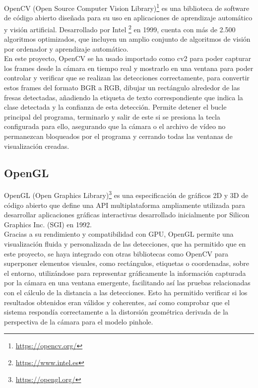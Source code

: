 OpenCV (Open Source Computer Vision Library)\footnote{\url{https://opencv.org/}} es una biblioteca de software de código abierto diseñada para su uso en aplicaciones de aprendizaje automático y visión artificial. Desarrollado por Intel \footnote{\url{https://www.intel.es}} en 1999, cuenta con más de 2.500 algoritmos optimizados, que incluyen un amplio conjunto de algoritmos de visión por ordenador y aprendizaje automático.\\ %

En este proyecto, OpenCV se ha usado importado como cv2 para poder capturar los frames desde la cámara en tiempo real y mostrarlo en una ventana para poder controlar y verificar que se realizan las detecciones correctamente, para convertir estos frames del formato BGR a RGB, dibujar un rectángulo alrededor de las fresas detectadas, añadiendo la etiqueta de texto correspondiente que indica la clase detectada y la confianza de esta detección. Permite detener el bucle principal del programa, terminarlo y salir de este si se presiona la tecla configurada para ello, asegurando que la cámara o el archivo de vídeo no permanezcan bloqueados por el programa y cerrando todas las ventanas de visualización creadas.

\subsection{OpenGL}
\label{sec:OpenCV}

OpenGL (Open Graphics Library)\footnote{\url{https://opengl.org/}} es una especificación de gráficos 2D y 3D de código abierto que define una API multiplataforma ampliamente utilizada para desarrollar aplicaciones gráficas interactivas desarrollado inicialmente por Silicon Graphics Inc. (SGI) en 1992.\\

Gracias a su rendimiento y compatibilidad con GPU, OpenGL permite una visualización fluida y personalizada de las detecciones, que ha permitido que en este proyecto, se haya integrado con otras bibliotecas como OpenCV para superponer elementos visuales, como rectángulos, etiquetas o coordenadas, sobre el entorno, utilizándose para representar gráficamente la información capturada por la cámara en una ventana emergente, facilitando así las pruebas relacionadas con el cálculo de la distancia a las detecciones. Esto ha permitido verificar si los resultados obtenidos eran válidos y coherentes, así como comprobar que el sistema respondía correctamente a la distorsión geométrica derivada de la perspectiva de la cámara para el modelo pinhole.

